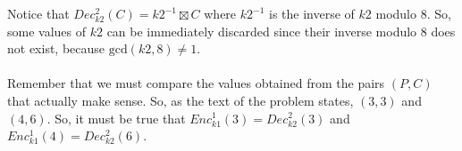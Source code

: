 \documentclass[11pt, a4paper]{article}
\begin{document}
Notice that $Dec^2_{k2}(C)=k2^{-1}\boxtimes C$ where $k2^{-1}$ is the inverse of $k2$ modulo 8. So, some values of $k2$ can be immediately discarded since their inverse modulo 8 does not exist, because $\text{gcd}(k2,8)\not=1$.\\\\
Remember that we must compare the values obtained from the pairs $(P,C)$ that actually make sense. So, as the text of the problem states, $(3,3)$ and $(4,6)$. So, it must be true that $Enc^1_{k1}(3)=Dec^2_{k2}(3)$ and $Enc^1_{k1}(4)=Dec^2_{k2}(6)$.
\end{document}
